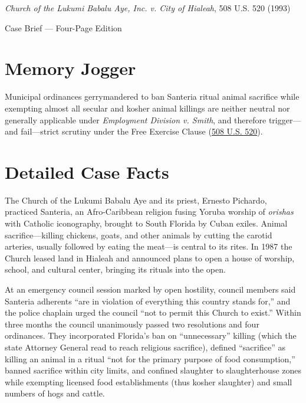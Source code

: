 \documentclass[12pt]{article}
\begin{document}
\begin{center}
{\LARGE \textit{Church of the Lukumi Babalu Aye, Inc. v. City of Hialeah}, 508 U.S. 520 (1993)\par}
\vspace{0.8em}
{\large Case Brief --- Four-Page Edition\par}
\end{center}
\vspace{1em}

\section{Memory Jogger}

Municipal ordinances gerrymandered to ban Santeria ritual animal sacrifice while exempting almost all secular and kosher animal killings are neither neutral nor generally applicable under \textit{Employment Division v. Smith}, and therefore trigger---and fail---strict scrutiny under the Free Exercise Clause (\href{https://supreme.justia.com/cases/federal/us/508/520/}{508 U.S. 520}).

\section{Detailed Case Facts}

The Church of the Lukumi Babalu Aye and its priest, Ernesto Pichardo, practiced Santeria, an Afro-Caribbean religion fusing Yoruba worship of \textit{orishas} with Catholic iconography, brought to South Florida by Cuban exiles. Animal sacrifice---killing chickens, goats, and other animals by cutting the carotid arteries, usually followed by eating the meat---is central to its rites. In 1987 the Church leased land in Hialeah and announced plans to open a house of worship, school, and cultural center, bringing its rituals into the open.

At an emergency council session marked by open hostility, council members said Santeria adherents ``are in violation of everything this country stands for,'' and the police chaplain urged the council ``not to permit this Church to exist.'' Within three months the council unanimously passed two resolutions and four ordinances. They incorporated Florida's ban on ``unnecessary'' killing (which the state Attorney General read to reach religious sacrifice), defined ``sacrifice'' as killing an animal in a ritual ``not for the primary purpose of food consumption,'' banned sacrifice within city limits, and confined slaughter to slaughterhouse zones while exempting licensed food establishments (thus kosher slaughter) and small numbers of hogs and cattle.
\end{document}
